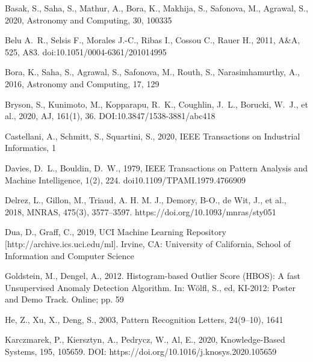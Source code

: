 \documentclass[fleqn,usenatbib]{mnras}
\begin{document}
\begin{thebibliography}{99}

 Basak, S., Saha, S., Mathur, A., Bora, K., Makhija, S., Safonova, M., Agrawal, S., 2020, Astronomy and Computing, 30, 100335


 Belu A.~R., Selsis F., Morales J.-C., Ribas I., Cossou C., Rauer H., 2011, A\&A, 525, A83. doi:10.1051/0004-6361/201014995


 Bora, K., Saha, S., Agrawal, S., Safonova, M., Routh, S., Narasimhamurthy, A., 2016, Astronomy and Computing, 17, 129

 Bryson, S., Kunimoto, M.,  Kopparapu, R.~K., Coughlin,  J.~L., Borucki, W.~J., et al., 2020, AJ, 161(1), 36. DOI:10.3847/1538-3881/abc418 

 Castellani, A., Schmitt, S.,  Squartini, S., 2020, IEEE Transactions on Industrial Informatics, 1

 Davies, D.~L., Bouldin, D.~W., 1979, IEEE Transactions on Pattern Analysis and Machine Intelligence, 1(2), 224. doi10.1109/TPAMI.1979.4766909

 Delrez, L., Gillon, M., Triaud, A. H. M. J., Demory, B-O., de Wit, J., et al., 2018, MNRAS, 475(3), 3577–3597.  https://doi.org/10.1093/mnras/sty051

 Dua, D., Graff, C., 2019, UCI Machine Learning Repository [http://archive.ics.uci.edu/ml]. Irvine, CA: University of California, School of Information and Computer Science

 Goldstein, M., Dengel, A., 2012. Histogram-based Outlier Score (HBOS): A fast Unsupervised Anomaly Detection Algorithm. In: Wölfl, S., ed, KI-2012: Poster and Demo Track. Online; pp. 59

 He, Z., Xu, X., Deng, S., 2003, Pattern Recognition Letters, 24(9–10), 1641

 Karczmarek, P., Kiersztyn, A.,  Pedrycz, W., Al, E., 2020, Knowledge-Based Systems, 195, 105659. DOI: https://doi.org/10.1016/j.knosys.2020.105659


\end{thebibliography}
\end{document}

